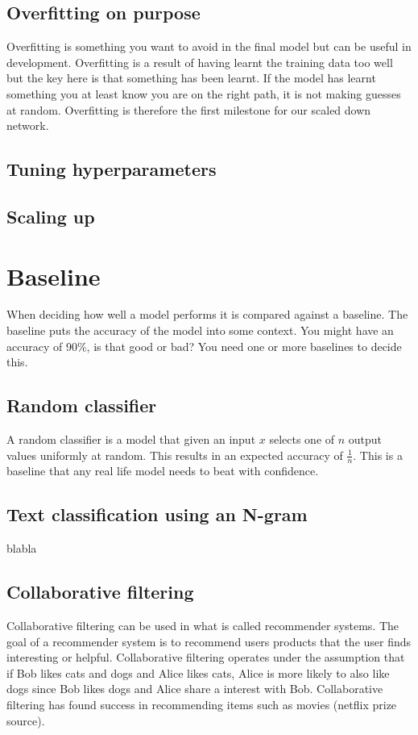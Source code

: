\subsection{Overfitting on purpose}
Overfitting is something you want to avoid in the final model but can be useful in development. Overfitting is a result of having learnt the training data too well but the key here is that something has been learnt. If the model has learnt something you at least know you are on the right path, it is not making guesses at random. Overfitting is therefore the first milestone for our scaled down network. 
\subsection{Tuning hyperparameters}
\subsection{Scaling up}
\section{Baseline}
When deciding how well a model performs it is compared against a baseline. The baseline puts the accuracy of the model into some context. You might have an accuracy of 90\%, is that good or bad? You need one or more baselines to decide this. 
\subsection{Random classifier}
A random classifier is a model that given an input $x$ selects one of $n$ output values uniformly at random. This results in an expected accuracy of $\frac{1}{n}$. This is a baseline that any real life model needs to beat with confidence.
\subsection{Text classification using an N-gram}
blabla

\subsection{Collaborative filtering}
Collaborative filtering can be used in what is called recommender systems. The goal of a recommender system is to recommend users products that the user finds interesting or helpful. Collaborative filtering operates under the assumption that if Bob likes cats and dogs and Alice likes cats, Alice is more likely to also like dogs since Bob likes dogs and Alice share a interest with Bob. Collaborative filtering has found success in recommending items such as movies (netflix prize source). %

